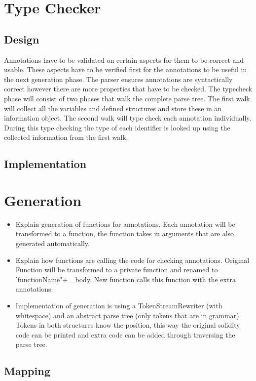 \documentclass[a4paper]{article}
\begin{document}
\section{Type Checker}
\label{sec:typechecker}
\subsection{Design}
Annotations have to be validated on certain aspects for them to be correct and usable. These aspects have to be verified first for the annotations to be useful in the next generation phase. The parser ensures annotations are syntactically correct however there are more properties that have to be checked. The typecheck phase will consist of two phases that walk the complete parse tree. The first walk will collect all the variables and defined structures and store these in an information object. The second walk will type check each annotation individually. During this type checking the type of each identifier is looked up using the collected information from the first walk. 
\subsection{Implementation}


\section{Generation}
\label{sec:generation}
\begin{itemize}
    \item Explain generation of functions for annotations. Each annotation will be transformed to a function, the function takes in arguments that are also generated automatically.
    \item Explain how functions are calling the code for checking annotations. Original Function will be transformed to a private function and renamed to 'functionName"+ \_body. New function calls this function with the extra annotations.
    \item Implementation of generation is using a TokenStreamRewriter (with whitespace) and an abstract parse tree (only tokens that are in grammar). Tokens in both structures know the position, this way the original solidity code can be printed and extra code can be added through traversing the parse tree.
\end{itemize}
\subsection{Mapping}
\end{document}

